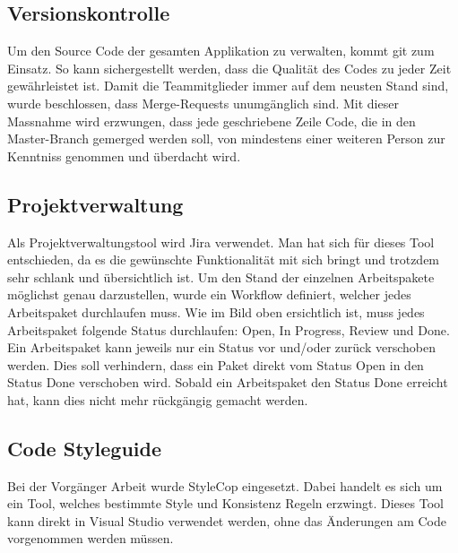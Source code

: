 \subsection{Versionskontrolle}
Um den Source Code der gesamten Applikation zu verwalten, kommt git zum Einsatz. So kann sichergestellt werden, dass die Qualität des Codes zu jeder Zeit gewährleistet ist. Damit die Teammitglieder immer auf dem neusten Stand sind, wurde beschlossen, dass Merge-Requests unumgänglich sind. Mit dieser Massnahme wird erzwungen, dass jede geschriebene Zeile Code, die in den Master-Branch gemerged werden soll, von mindestens einer weiteren Person zur Kenntniss genommen und überdacht wird. 

\subsection{Projektverwaltung}
Als Projektverwaltungstool wird Jira verwendet. Man hat sich für dieses Tool entschieden, da es die gewünschte Funktionalität mit sich bringt und trotzdem sehr schlank und übersichtlich ist. Um den Stand der einzelnen Arbeitspakete möglichst genau darzustellen, wurde ein Workflow definiert, welcher jedes Arbeitspaket durchlaufen muss.
Wie im Bild oben ersichtlich ist, muss jedes Arbeitspaket folgende Status durchlaufen: Open, In Progress, Review und Done. Ein Arbeitspaket kann jeweils nur ein Status vor und/oder zurück verschoben werden. Dies soll verhindern, dass ein Paket direkt vom Status Open in den Status Done verschoben wird. Sobald ein Arbeitspaket den Status Done erreicht hat, kann dies nicht mehr rückgängig gemacht werden. 

\subsection{Code Styleguide}
Bei der Vorgänger Arbeit wurde StyleCop eingesetzt. Dabei handelt es sich um ein Tool, welches bestimmte Style und Konsistenz Regeln erzwingt. Dieses Tool kann direkt in Visual Studio verwendet werden, ohne das Änderungen am Code vorgenommen werden müssen.

